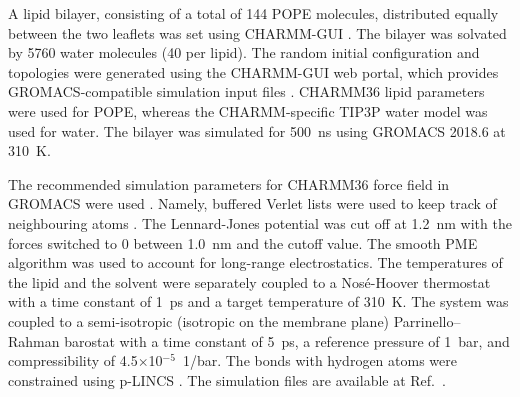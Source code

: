 \documentclass[journal=jpcbfk]{achemso}
\begin{document}
 A lipid bilayer, consisting of a total of 144 POPE molecules, distributed equally between the two leaflets was set using CHARMM-GUI \cite{lee16}. The bilayer was solvated by 5760 water molecules (40 per lipid). The random initial configuration and topologies were generated using the CHARMM-GUI web portal, which provides  GROMACS-compatible simulation input files \cite{lee16}. CHARMM36 lipid parameters \cite{klauda10} were used for POPE, whereas the CHARMM-specific TIP3P water model \cite{jorgensen83} was used for water. The bilayer was simulated for 500~ns using GROMACS 2018.6 at 310~K.

The recommended simulation parameters for CHARMM36 force field in GROMACS were used \cite{lee16}. Namely, buffered Verlet lists were used to keep track of neighbouring atoms \cite{Pall13}. The Lennard-Jones potential was cut off at 1.2~nm with the forces switched to 0 between 1.0~nm and the cutoff value. The smooth PME algorithm \cite{darden93,essman95} was used to account for long-range electrostatics. The temperatures of the lipid and the solvent were separately coupled to a Nos\'{e}-Hoover thermostat \cite{nose84,hoover85} with a time constant of 1~ps and a target temperature of 310~K. The system was coupled to a semi-isotropic (isotropic on the membrane plane) Parrinello--Rahman barostat \cite{parrinello81} with a time constant of 5~ps, a reference pressure of 1~bar, and compressibility of 4.5$\times$10$^{-5}$~1/bar. The bonds with hydrogen atoms were constrained using p-LINCS \cite{hess07,hess97}. The simulation files are available at Ref.~.

\end{document}
